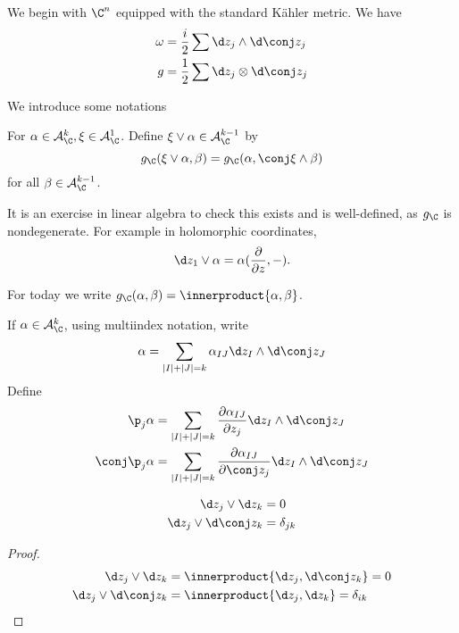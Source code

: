 \documentclass[a4paper]{article}
\newcommand{\w}{\wedge} %
\newcommand*{\ip}{\innerproduct}
\begin{document}
We begin with \(\C^n\) equipped with the standard Kähler metric. We have
\begin{align*}
  \omega &= \frac{i}{2} \sum \d z_j \w \d \conj z_j \\
  g &= \frac{1}{2} \sum \d z_j \otimes \d \conj z_j
\end{align*}

We introduce some notations
\begin{definition}
  For \(\alpha \in \mathcal A_\C^k, \xi \in \mathcal A_\C^1\). Define \(\xi \vee \alpha \in \mathcal A_\C^{k - 1}\) by
  \[
    g_\C(\xi \vee \alpha, \beta) = g_\C(\alpha, \conj \xi \w \beta)
  \]
  for all \(\beta \in \mathcal A_\C^{k - 1}\).
\end{definition}
It is an exercise in linear algebra to check this exists and is well-defined, as \(g_\C\) is nondegenerate. For example in holomorphic coordinates,
\[
  \d z_1 \vee \alpha = \alpha( \frac{\partial  }{\partial z}, -).
\]

For today we write \(g_\C(\alpha, \beta) = \ip{\alpha, \beta}\).

\begin{definition}
  If \(\alpha \in \mathcal A_\C^k\), using multiindex notation, write
  \[
    \alpha = \sum_{|I| + |J| = k} \alpha_{IJ} \d z_I \w \d \conj z_J
  \]
  Define
  \begin{align*}
    \p_j \alpha &= \sum_{|I| + |J| = k} \frac{\partial \alpha_{IJ}}{\partial z_j} \d z_I \w \d \conj z_J \\
    \conj \p_j \alpha &= \sum_{|I| + |J| = k} \frac{\partial \alpha_{IJ}}{\partial \conj z_j} \d z_I \w \d \conj z_J
  \end{align*}
\end{definition}

\begin{lemma}
  \begin{align*}
    \d z_j \vee \d z_k &= 0 \\
    \d z_j \vee \d \conj z_k &= \delta_{jk}
  \end{align*}
\end{lemma}

\begin{proof}
  \begin{align*}
    \d z_j \vee \d z_k &= \ip{\d z_j, \d \conj z_k} = 0 \\
    \d z_j \vee \d \conj z_k &= \ip{\d z_j, \d z_k} = \delta_{ik}
  \end{align*}
\end{proof}
\end{document}
